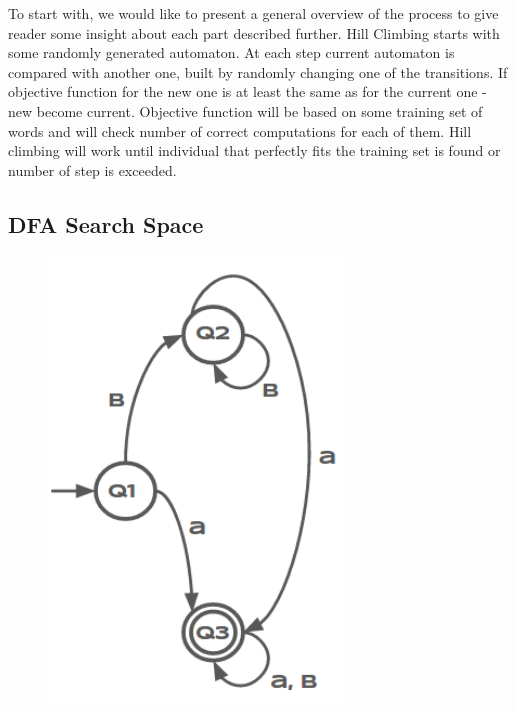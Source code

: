 \documentclass{mini}
\begin{document}
To start with, we would like to present a general overview of the process to give reader some insight about each part described further. Hill Climbing starts with some randomly generated automaton. At each step current automaton is compared with another one, built by randomly changing one of the transitions. If objective function for the new one is at least the same as for the current one - new become current. Objective function will be based on some training set of words and will check number of correct computations for each of them. Hill climbing will work until individual that perfectly fits the training set is found or number of step is exceeded.

\subsection{DFA Search Space}

\begin{figure}
  \begin{center}
    \includegraphics[width=0.7\textwidth]{./images/hc_automata.png}
  \end{center}
\end{figure}
\end{document}
